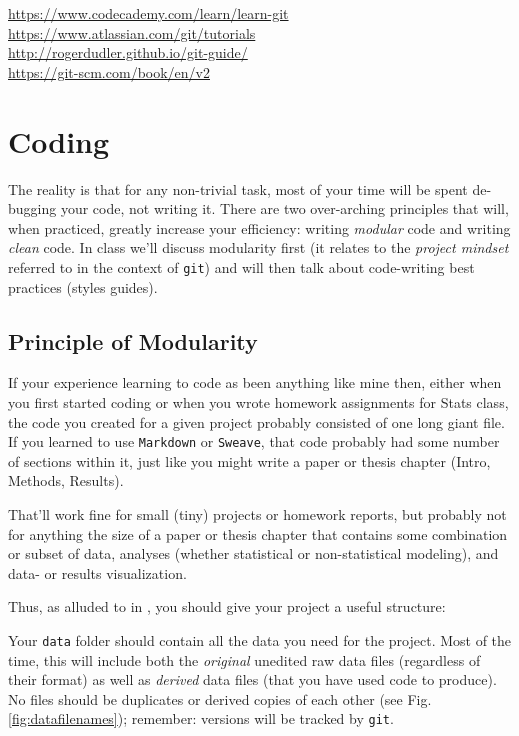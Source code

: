 \documentclass[12pt,letterpaper]{article}
\begin{document}
\url{https://www.codecademy.com/learn/learn-git}\\
\url{https://www.atlassian.com/git/tutorials}\\
\url{http://rogerdudler.github.io/git-guide/}\\
\url{https://git-scm.com/book/en/v2}



\pagebreak


\section{Coding}
The reality is that for any non-trivial task, most of your time will be spent de-bugging your code, not writing it.  There are two over-arching principles that will, when practiced, greatly increase your efficiency:  writing \emph{modular} code and writing \emph{clean} code.  In class we'll discuss modularity first (it relates to the \emph{project mindset} referred to in the context of \texttt{git}) and will then talk about code-writing best practices (styles guides).

\subsection{Principle of Modularity}
If your experience learning to code as been anything like mine then, either when you first started coding or when you wrote homework assignments for Stats class, the code you created for a given project probably consisted of one long giant file.  If you learned to use \texttt{Markdown} or \texttt{Sweave}, that code probably had some number of sections within it, just like you might write a paper or thesis chapter (Intro, Methods, Results).  

That'll work fine for small (tiny) projects or homework reports, but probably not for anything the size of a paper or thesis chapter that contains some combination or subset of data, analyses (whether statistical or non-statistical modeling), and data- or results visualization.

Thus, as alluded to in , you should give your project a useful structure:

Your \texttt{data} folder should contain all the data you need for the project.  Most of the time, this will include both the \emph{original} unedited raw data files (regardless of their format) as well as \emph{derived} data files (that you have used code to produce).  No files should be duplicates or derived copies of each other (see Fig. \ref{fig:datafilenames}); remember: versions will be tracked by \texttt{git}. 
\end{document}
